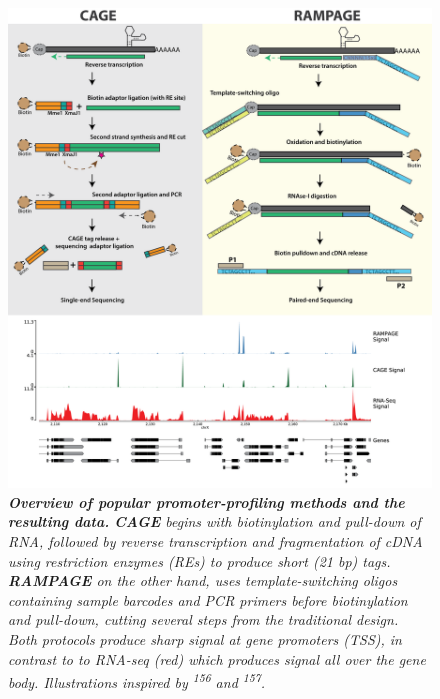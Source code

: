 \documentclass[11pt,twoside]{MPIthesis}
\theoremstyle{definition}
\theoremstyle{definition}
\theoremstyle{definition}
\theoremstyle{remark}
\begin{document}
\begin{figure}

{\centering \includegraphics[width=0.8\linewidth]{figures/intro_fig5} 

}

\caption[Overview of popular promoter-profiling methods and the resulting data]{\emph{\textbf{Overview of popular promoter-profiling methods
and the resulting data.} \textbf{CAGE} begins with biotinylation and
pull-down of RNA, followed by reverse transcription and fragmentation of
cDNA using restriction enzymes (REs) to produce short (21 bp) tags.
\textbf{RAMPAGE} on the other hand, uses template-switching oligos
containing sample barcodes and PCR primers before biotinylation and
pull-down, cutting several steps from the traditional design. Both
protocols produce sharp signal at gene promoters (TSS), in contrast to
to RNA-seq (red) which produces signal all over the gene body.
Illustrations inspired by \textsuperscript{156} and
\textsuperscript{157}.}}\label{fig:unnamed-chunk-5}
\end{figure}












\clearpage
\end{document}
